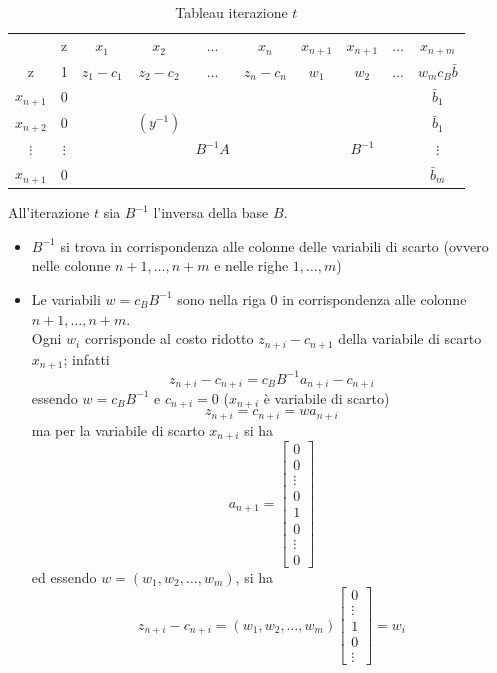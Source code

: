\begin{table}[h]
	\centering
	\caption{Tableau iterazione $t$}
	\begin{tabular}{c|c|cccc|cccc|}
		& z & $x_{1}$ & $x_{2}$ & $\dots$ & $x_{n}$ & $x_{n+1}$ & $x_{n+1}$ & $\dots$ & $x_{n+m}$ \\ \cline{2-10}
		z & 1 & $z_{1}-c_{1}$ & $z_{2}-c_{2}$ & $\dots$ & $z_{n}-c_{n}$ & $w_{1}$ & $w_{2}$ & $\dots$ & $w_{m}c_{B}\bar{b}$ \\ \cline{2-10}
		$x_{n+1}$ & 0 &  &  &  &  &  &  &  & $\bar{b}_{1}$ \\
		$x_{n+2}$ & 0 & & $(y^{-1})$ &  &  &  &  &  & $\bar{b}_{1}$ \\
		$\vdots$ & $\vdots$ &  &  & $B^{-1}A$ &  &  & $B^{-1}$ & & $\vdots$ \\
		$x_{n+1}$ & 0 &  &  &  &  &  &  &  & $\bar{b}_{m}$ \\ \cline{2-10}
	\end{tabular}
\end{table}
All'iterazione $t$ sia $B^{-1}$ l'inversa della base $B$.
\begin{itemize}
	\item $B^{-1}$ si trova in corrispondenza alle colonne delle variabili di scarto (ovvero nelle colonne $n+1,\dots,n+m$ e nelle righe $1,\dots,m$)
	\item Le variabili $w=c_{B}B^{-1}$ sono nella riga 0 in corrispondenza alle colonne $n+1,\dots,n+m$.\\
	Ogni $w_{i}$ corrisponde al costo ridotto $z_{n+i}-c_{n+1}$ della variabile di scarto $x_{n+1}$; infatti
	\begin{equation*}
		z_{n+i}-c_{n+i}=c_{B}B^{-1}a_{n+i}-c_{n+i}
	\end{equation*}
	essendo $w=c_{B}B^{-1}$ e $c_{n+i}=0$ ($x_{n+i}$ è variabile di scarto)
	\begin{equation*}
		z_{n+i}=c_{n+i}=w a_{n+i}
	\end{equation*}
	ma per la variabile di scarto $x_{n+i}$ si ha
	\begin{equation*}
		a_{n+1}=\begin{bmatrix}
		0 \\ 0 \\ \vdots \\ 0 \\ 1 \\ 0 \\ \vdots \\ 0
		\end{bmatrix}
	\end{equation*}
	ed essendo $w=(w_{1},w_{2},\dots,w_{m})$, si ha
	\begin{equation*}
		z_{n+i}-c_{n+i}=(w_{1},w_{2},\dots,w_{m})\begin{bmatrix}
		0 \\ \vdots \\ 1 \\ 0 \\ \vdots
		\end{bmatrix}=w_{i}
	\end{equation*}
\end{itemize}
